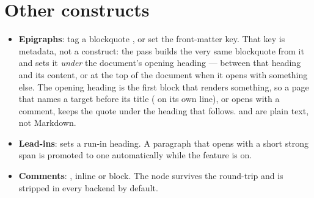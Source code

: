 \documentclass[a4paper,twoside]{article}
\begin{document}
\section{Other constructs}
\begin{itemize}
\item \textbf{Epigraphs}: tag a blockquote , or set the front-matter
 key. That key is metadata, not a construct: the
 pass builds the very same blockquote from it and sets it \emph{under}
the document's opening heading --- between that heading and its content, or at
the top of the document when it opens with something else. The opening
heading is the first block that renders something, so a page that names a
target before its title ( on its own line), or opens with a comment,
keeps the quote under the heading that follows.  and  are
plain text, not Markdown.
\item \textbf{Lead-ins}:  sets a run-in
heading. A paragraph that opens with a short strong span is promoted to one
automatically while the  feature is on.
\item \textbf{Comments}: , inline or block. The node survives the
round-trip and is stripped in every backend by default.
\end{itemize}
\end{document}
